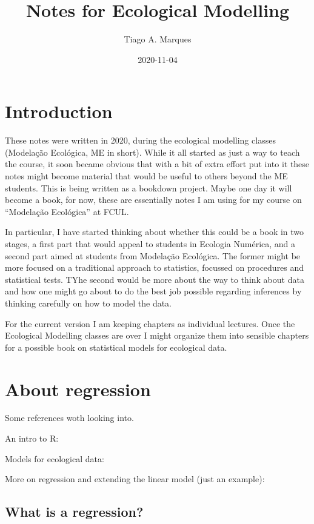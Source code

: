 \documentclass[
]{book}
\title{Notes for Ecological Modelling}
\author{Tiago A. Marques}
\date{2020-11-04}
\begin{document}
\maketitle

{
\setcounter{tocdepth}{1}
\tableofcontents
}
\hypertarget{introduction}{%
\chapter{Introduction}\label{introduction}}

These notes were written in 2020, during the ecological modelling classes (Modelação Ecológica, ME in short). While it all started as just a way to teach the course, it soon became obvious that with a bit of extra effort put into it these notes might become material that would be useful to others beyond the ME students. This is being written as a bookdown project. Maybe one day it will become a book, for now, these are essentially notes I am using for my course on ``Modelação Ecológica'' at FCUL.

In particular, I have started thinking about whether this could be a book in two stages, a first part that would appeal to students in Ecologia Numérica, and a second part aimed at students from Modelação Ecológica. The former might be more focused on a traditional approach to statistics, focussed on procedures and statistical tests. TYhe second would be more about the way to think about data and how one might go about to do the best job possible regarding inferences by thinking carefully on how to model the data.

For the current version I am keeping chapters as individual lectures. Once the Ecological Modelling classes are over I might organize them into sensible chapters for a possible book on statistical models for ecological data.

\hypertarget{about-regression}{%
\chapter{About regression}\label{about-regression}}

Some references woth looking into.

An intro to R: \citep{Zuur2009a}

Models for ecological data: \citep{Zuur2007}

More on regression and extending the linear model (just an example): \citep[\citet{Zuur2009b}]{Faraway2006}

\hypertarget{what-is-a-regression}{%
\section{What is a regression?}\label{what-is-a-regression}}
\end{document}
